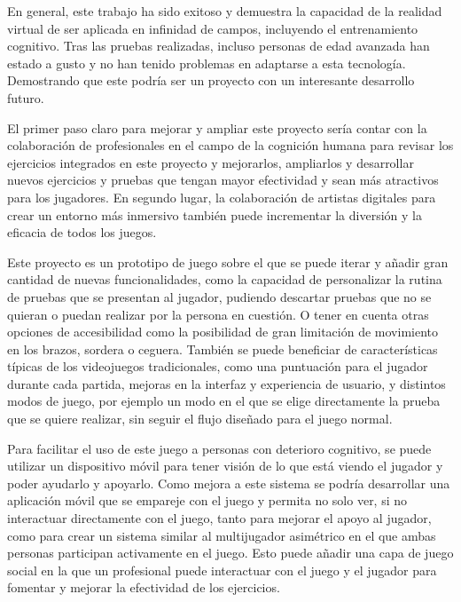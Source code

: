 
\vspace{5mm}

En general, este trabajo ha sido exitoso y demuestra la capacidad de la realidad virtual de ser aplicada en infinidad de campos, incluyendo el entrenamiento cognitivo. Tras las pruebas realizadas, incluso personas de edad avanzada han estado a gusto y no han tenido problemas en adaptarse a esta tecnología. Demostrando que este podría ser un proyecto con un interesante desarrollo futuro.


El primer paso claro para mejorar y ampliar este proyecto sería contar con la colaboración de profesionales en el campo de la cognición humana para revisar los ejercicios integrados en este proyecto y mejorarlos, ampliarlos y desarrollar nuevos ejercicios y pruebas que tengan mayor efectividad y sean más atractivos para los jugadores. En segundo lugar, la colaboración de artistas digitales para crear un entorno más inmersivo también puede incrementar la diversión y la eficacia de todos los juegos.

Este proyecto es un prototipo de juego sobre el que se puede iterar y añadir gran cantidad de nuevas funcionalidades, como la capacidad de personalizar la rutina de pruebas que se presentan al jugador, pudiendo descartar pruebas que no se quieran o puedan realizar por la persona en cuestión. O tener en cuenta otras opciones de accesibilidad como la posibilidad de gran limitación de movimiento en los brazos, sordera o ceguera. También se puede beneficiar de características típicas de los videojuegos tradicionales, como una puntuación para el jugador durante cada partida, mejoras en la interfaz y experiencia de usuario, y distintos modos de juego, por ejemplo un modo en el que se elige directamente la prueba que se quiere realizar, sin seguir el flujo diseñado para el juego normal.

Para facilitar el uso de este juego a personas con deterioro cognitivo, se puede utilizar un dispositivo móvil para tener visión de lo que está viendo el jugador y poder ayudarlo y apoyarlo. Como mejora a este sistema se podría desarrollar una aplicación móvil que se empareje con el juego y permita no solo ver, si no interactuar directamente con el juego, tanto para mejorar el apoyo al jugador, como para crear un sistema similar al multijugador asimétrico en el que ambas personas participan activamente en el juego. Esto puede añadir una capa de juego social en la que un profesional puede interactuar con el juego y el jugador para fomentar y mejorar la efectividad de los ejercicios.



